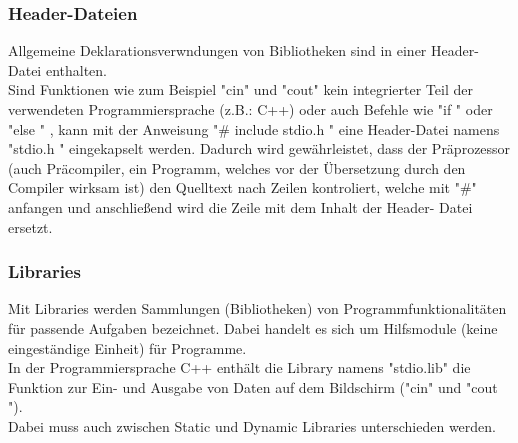 \documentclass[12pt,a4paper]{report}
\begin{document}
\subsubsection{Header-Dateien}
Allgemeine Deklarationsverwndungen von Bibliotheken sind in einer Header-Datei enthalten.
\\Sind Funktionen wie zum Beispiel "{}cin"{} und "{}cout{}" kein integrierter Teil der verwendeten Programmiersprache (z.B.: C++) oder auch Befehle wie "{}if "{} oder "{}else "{} , kann mit der Anweisung "{}\# include stdio.h "{} eine Header-Datei namens "{}stdio.h "{} eingekapselt werden. Dadurch wird gewährleistet, dass der Präprozessor (auch Präcompiler, ein Programm, welches vor der Übersetzung durch den Compiler wirksam ist) den Quelltext nach Zeilen kontroliert, welche mit "{}\#"{} anfangen und anschließend wird die Zeile mit dem Inhalt der Header- Datei ersetzt.

\subsubsection{Libraries}
Mit Libraries werden Sammlungen (Bibliotheken) von Programmfunktionalitäten für passende Aufgaben bezeichnet. Dabei handelt es sich um Hilfsmodule (keine eingeständige Einheit) für Programme.\\
In der Programmiersprache C++ enthält die Library namens "{}stdio.lib"{} die Funktion zur Ein- und Ausgabe von Daten auf dem Bildschirm ("{}cin"{} und "{}cout "{}).\\
Dabei muss auch zwischen Static und Dynamic Libraries unterschieden werden.
\end{document}
